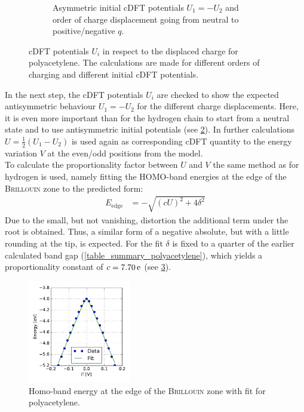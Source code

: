 \begin{figure}[!p]
\begin{subfigure}{0.45\textwidth}
	\caption{Asymmetric initial cDFT potentials $U_1 = -U_2$ and order of charge displacement going from neutral to  positive/negative $q$.}
	\label{}
	\end{subfigure}
	\caption{cDFT potentials $U_i$ in respect to the displaced charge for polyacetylene. The calculations are made for different orders of charging and different initial cDFT potentials.}
	\label{image_polyacetylene_potentials_asymmetry}
\end{figure}
In the next step, the cDFT potentials $U_i$ are checked to show the expected antisymmetric behaviour $U_1 = -U_2$ for the different charge displacements. Here, it is even more important than for the hydrogen chain to start from a neutral state and to use antisymmetric initial potentials (see \cref{image_polyacetylene_potentials_asymmetry}). In further calculations $U = \frac{1}{2}(U_1 - U_2)$ is used again as corresponding cDFT quantity to the energy variation $V$ at the even/odd positions from the model.\\
To calculate the proportionality factor between $U$ and $V$ the same method as for hydrogen is used, namely fitting the HOMO-band energies at the edge of the \textsc{Brillouin} zone to the predicted form:
\begin{align}
	E_\text{edge} &= -\sqrt{\left(cU\right)^2 + 4 \delta^2}
\end{align}
Due to the small, but not vanishing, distortion the additional term under the root is obtained. Thus, a similar form of a negative absolute, but with a little rounding at the tip, is expected. For the fit $\delta$ is fixed to a quarter of the earlier calculated band gap (\cref{table_summary_polyacetylene}), which yields a proportionality constant of $c = \unit[7.70]{e}$ (see \cref{image_border_energy_polyacetylene}).\\
\begin{figure}
	\centering
	\includegraphics[width = 0.4\textwidth]{Images/polyacetylene/charging/border_energy_q_1}
	\caption{Homo-band energy at the edge of the \textsc{Brillouin} zone with fit for polyacetylene.}
	\label{image_border_energy_polyacetylene}
\end{figure}
